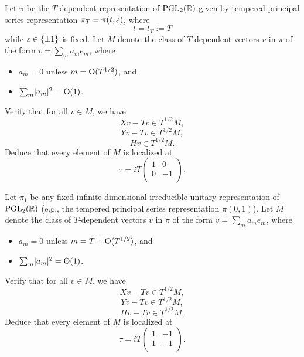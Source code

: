 \documentclass[reqno]{amsart} 
\numberwithin{equation}{section}
\numberwithin{theorem}{section}
\begin{document}
\begin{exercise}
  Let $\pi$ be the $T$-dependent representation of $\operatorname{PGL}_2(\mathbb{R})$ given by tempered principal series representation $\pi_T = \pi(t,\varepsilon)$, where
  \begin{equation*}
    t = t_T := T
  \end{equation*}
  while $\varepsilon \in \{\pm 1\}$ is fixed.  Let $M$ denote the class of $T$-dependent vectors $v$ in $\pi$ of the form $v = \sum_m a_m e_m$, where
  \begin{itemize}
  \item $a_m = 0$ unless $m = \operatorname{O}(T^{1/2})$, and
  \item $\sum_m \lvert a_m \rvert^2 = \operatorname{O}(1)$.
  \end{itemize}
  Verify that for all $v \in M$, we have
  \begin{equation*}
    X v - T v \in T^{1/2} M,
  \end{equation*}
  \begin{equation*}
    Y v - T v \in T^{1/2}  M,
  \end{equation*}
  \begin{equation*}
    H v \in T^{1/2} M.
  \end{equation*}
  Deduce that every element of $M$ is localized at
  \begin{equation*}
    \tau = i T \begin{pmatrix}
                 1 &  0 \\
        0 & -1 \\
    \end{pmatrix}.
  \end{equation*}
\end{exercise}

\begin{exercise}
  Let $\pi_1$ be any fixed infinite-dimensional irreducible unitary representation of $\operatorname{PGL}_2(\mathbb{R})$ (e.g., the tempered principal series representation $\pi(0,1)$).  Let $M$ denote the class of $T$-dependent vectors $v$ in $\pi$ of the form $v = \sum_m a_m e_m$, where
  \begin{itemize}
\item $a_m = 0$ unless $m = T + \operatorname{O}(T^{1/2})$, and
\item $\sum_m \lvert a_m  \rvert^2 = \operatorname{O}(1) $.
\end{itemize}
Verify that for all $v \in M$, we have
\begin{equation*}
X v - T v \in T^{1/2} M,
\end{equation*}
\begin{equation*}
Y v - T v \in T^{1/2} M,
\end{equation*}
\begin{equation*}
H v - T v \in T^{1/2} M.
\end{equation*}
Deduce that every element of $M$ is localized at
\begin{equation*}
 \tau =  i T
\begin{pmatrix}
  1 & -1 \\
  1 & -1 \\
\end{pmatrix}.
\end{equation*}
\end{exercise}
\end{document}

